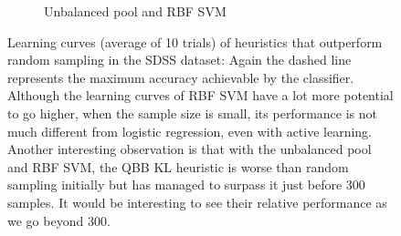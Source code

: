 \begin{figure}[p]
\begin{subfigure}{.5\textwidth}
		\caption{Unbalanced pool and RBF SVM}
		\label{fig:sdss_ur_ind_upper}
	\end{subfigure}
	\caption[Learning curves of heuristics better than random (SDSS)]{Learning curves (average of 10
        trials) of heuristics that outperform random sampling in the SDSS dataset: Again the dashed line
        represents the maximum accuracy achievable by the classifier. Although the learning curves of RBF
        SVM have a lot more potential to go higher, when the sample size is small, its performance is not
        much different from logistic regression, even with active learning. Another interesting
        observation is that with the unbalanced pool and RBF SVM, the QBB KL heuristic is worse than
        random sampling initially but has managed to surpass it just before 300 samples. It would be
        interesting to see their relative performance as we go beyond 300.} \label{fig:sdss_ind_upper}
\end{figure}


